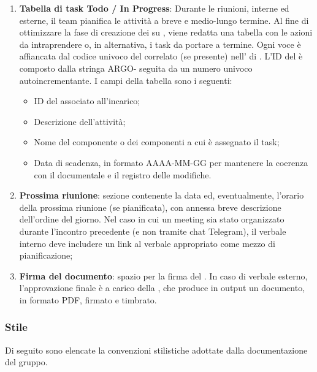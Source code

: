 \begin{enumerate}
\begin{itemize}
  \end{itemize}
  \item \textbf{Tabella di task Todo / In Progress}:
  Durante le riunioni, interne ed esterne, il team pianifica le attività a breve e medio-lungo termine. Al fine di ottimizzare la fase di creazione dei  su , viene redatta una tabella con le azioni da intraprendere o, in alternativa, i task da portare a termine. Ogni voce è affiancata dal codice univoco del  correlato (se presente) nell' di . L'ID del  è composto dalla stringa ARGO- seguita da un numero univoco autoincrementante. I campi della tabella sono i seguenti:
  \begin{itemize}
    \item ID del   associato all'incarico;
    \item Descrizione dell'attività;
    \item Nome del componente o dei componenti a cui è assegnato il task;
    \item Data di scadenza, in formato AAAA-MM-GG per mantenere la coerenza con il  documentale e il registro delle modifiche.
  \end{itemize}
  \item \textbf{Prossima riunione}: sezione contenente la data ed, eventualmente, l'orario della prossima riunione (se pianificata), con annessa breve descrizione dell'ordine del giorno. Nel caso in cui un meeting sia stato organizzato durante l'incontro precedente (e non tramite chat Telegram), il verbale interno deve includere un link al verbale appropriato come mezzo di pianificazione;
  \item \textbf{Firma del documento}: spazio per la firma del \Responsabile{}. In caso di verbale esterno, l'approvazione finale è a carico della , che produce in output un documento, in formato PDF, firmato e timbrato.
\end{enumerate}

\subsubsection{Stile}
\par Di seguito sono elencate la convenzioni stilistiche adottate dalla documentazione del gruppo.

